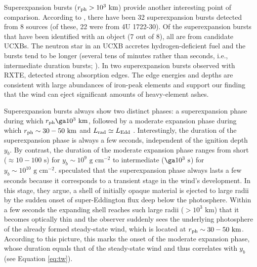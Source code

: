 \documentclass[apj,usenatbib, iop, twocolappendix]{emulateapj}
\newcommand{\Lrad}{L_{\rm rad}}
\newcommand{\Ledd}{L_{\rm Edd}}
\newcommand{\trm}[1]{\textrm{#1}}
\begin{document}
Superexpansion bursts ($r_{\rm ph}>10^3\trm{ km}$) provide another interesting point of comparison.  According to , there have been 32 superexpansion bursts  detected from 8 sources (of these, 22 were from 4U 1722-30).  Of the superexpansion bursts that have been identified with an object (7 out of 8), all are from candidate UCXBs. The neutron star in an UCXB accretes hydrogen-deficient fuel and the bursts tend to be longer (several tens of minutes rather than seconds, i.e., intermediate duration bursts; \citealt{intZand:05, Cumming:06}).  In two superexpansion bursts observed with RXTE,  detected strong absorption edges.   The edge energies and depths are consistent with large abundances of iron-peak elements and support our finding that the wind can eject significant amounts of heavy-element ashes. 

Superexpansion bursts always show two distinct phases: a superexpansion phase during which $r_{\rm ph} \ga 10^3\trm{ km}$, followed by a moderate expansion phase during which $r_{\rm ph}\sim 30-50\trm{ km}$ and $\Lrad \simeq \Ledd$ .  Interestingly, the duration of the superexpansion phase is always a few seconds, independent of the ignition depth $y_b$.  By contrast, the duration of the moderate expansion phase ranges from short ($\approx 10-100\trm{ s}$) for $y_b\sim 10^9\trm{ g cm}^{-2}$ to intermediate ($\ga 10^3\trm{ s}$) for $y_b\sim 10^{10}\trm{ g cm}^{-2}$.  speculated that the superexpansion phase always lasts a few seconds because it corresponds to a transient stage in the wind's development.  In this stage, they argue, a shell of initially opaque material is ejected to large radii by the sudden onset of super-Eddington flux deep below the photosphere.  Within a few seconds the expanding shell reaches such large radii ($>10^3\trm{ km}$) that it becomes optically thin and the observer suddenly sees the underlying  photosphere of the already formed steady-state wind, which is located at $r_{\rm ph}\sim30-50\trm{ km}$. According to this picture, this marks the onset of the moderate expansion phase, whose duration equals that of the steady-state wind and thus correlates with $y_b$ (see Equation \ref{eq:tw}).
\end{document}
